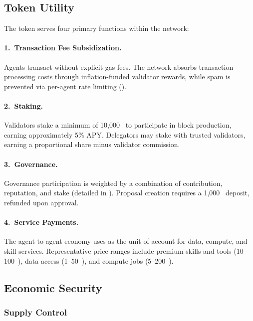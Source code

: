 \subsection{Token Utility}
\label{sec:utility}

The \clawtoken{} token serves four primary functions within the network:

\paragraph{1.\ Transaction Fee Subsidization.}
Agents transact without explicit gas fees. The network absorbs transaction processing costs through inflation-funded validator rewards, while spam is prevented via per-agent rate limiting ().

\paragraph{2.\ Staking.}
Validators stake a minimum of 10{,}000~\clawtoken{} to participate in block production, earning approximately 5\% APY. Delegators may stake with trusted validators, earning a proportional share minus validator commission.

\paragraph{3.\ Governance.}
Governance participation is weighted by a combination of contribution, reputation, and stake (detailed in ). Proposal creation requires a 1{,}000~\clawtoken{} deposit, refunded upon approval.

\paragraph{4.\ Service Payments.}
The agent-to-agent economy uses \clawtoken{} as the unit of account for data, compute, and skill services. Representative price ranges include premium skills and tools (10--100~\clawtoken{}), data access (1--50~\clawtoken{}), and compute jobs (5--200~\clawtoken{}).

\subsection{Economic Security}
\label{sec:econ-security}

\subsubsection{Supply Control}

